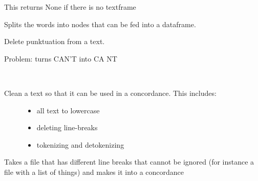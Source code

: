 \documentclass[letterpaper,10pt,english]{sphinxmanual}
\begin{document}
\begin{fulllineitems}
\begin{fulllineitems}
This returns None if there is no textframe

\end{fulllineitems}


\begin{fulllineitems}
\label{apidoc:kwicgrouper.KWICgrouper.split_nodes}
Splits the words into nodes that can be fed into a dataframe.

\end{fulllineitems}


\end{fulllineitems}


\begin{fulllineitems}
\label{apidoc:kwicgrouper.clean_punkt}
Delete punktuation from a text.

Problem: turns CAN'T into CA NT

\end{fulllineitems}


\begin{fulllineitems}
\label{apidoc:kwicgrouper.clean_text}~\begin{description}
\item[{Clean a text so that it can be used in a concordance. This includes:}] \leavevmode\begin{itemize}
\item {} 
all text to lowercase

\item {} 
deleting line-breaks

\item {} 
tokenizing and detokenizing

\end{itemize}

\end{description}

\end{fulllineitems}


\begin{fulllineitems}
\label{apidoc:kwicgrouper.concordance_for_line_by_line_file}
Takes a file that has different line breaks that cannot be ignored
(for instance a file with a list of things) and makes it into a concordance

\end{fulllineitems}
\end{document}
